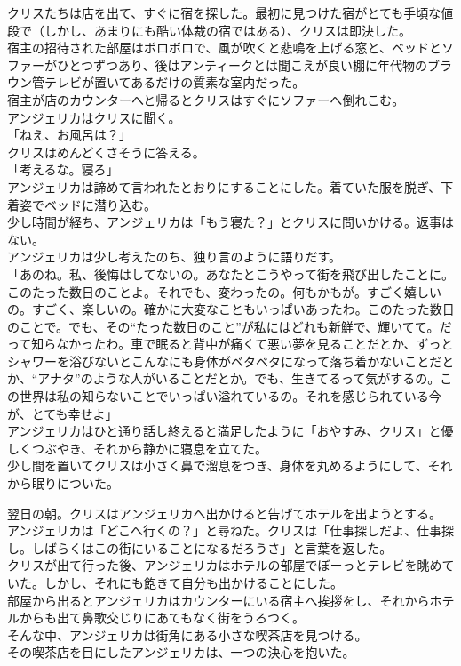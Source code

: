 \documentclass[b5j,10pt,openany]{jsbook}
\begin{document}
クリスたちは店を出て、すぐに宿を探した。最初に見つけた宿がとても手頃な値段で（しかし、あまりにも酷い体裁の宿ではある）、クリスは即決した。\\宿主の招待された部屋はボロボロで、風が吹くと悲鳴を上げる窓と、ベッドとソファーがひとつずつあり、後はアンティークとは聞こえが良い棚に年代物のブラウン管テレビが置いてあるだけの質素な室内だった。\\宿主が店のカウンターへと帰るとクリスはすぐにソファーへ倒れこむ。\\アンジェリカはクリスに聞く。\\「ねえ、お風呂は？」\\クリスはめんどくさそうに答える。\\「考えるな。寝ろ」\\アンジェリカは諦めて言われたとおりにすることにした。着ていた服を脱ぎ、下着姿でベッドに潜り込む。\\少し時間が経ち、アンジェリカは「もう寝た？」とクリスに問いかける。返事はない。\\アンジェリカは少し考えたのち、独り言のように語りだす。\\「あのね。私、後悔はしてないの。あなたとこうやって街を飛び出したことに。このたった数日のことよ。それでも、変わったの。何もかもが。すごく嬉しいの。すごく、楽しいの。確かに大変なこともいっぱいあったわ。このたった数日のことで。でも、その``たった数日のこと''が私にはどれも新鮮で、輝いてて。だって知らなかったわ。車で眠ると背中が痛くて悪い夢を見ることだとか、ずっとシャワーを浴びないとこんなにも身体がベタベタになって落ち着かないことだとか、``アナタ''のような人がいることだとか。でも、生きてるって気がするの。この世界は私の知らないことでいっぱい溢れているの。それを感じられている今が、とても幸せよ」\\アンジェリカはひと通り話し終えると満足したように「おやすみ、クリス」と優しくつぶやき、それから静かに寝息を立てた。\\少し間を置いてクリスは小さく鼻で溜息をつき、身体を丸めるようにして、それから眠りについた。

翌日の朝。クリスはアンジェリカへ出かけると告げてホテルを出ようとする。\\アンジェリカは「どこへ行くの？」と尋ねた。クリスは「仕事探しだよ、仕事探し。しばらくはこの街にいることになるだろうさ」と言葉を返した。\\クリスが出て行った後、アンジェリカはホテルの部屋でぼーっとテレビを眺めていた。しかし、それにも飽きて自分も出かけることにした。\\部屋から出るとアンジェリカはカウンターにいる宿主へ挨拶をし、それからホテルからも出て鼻歌交じりにあてもなく街をうろつく。\\そんな中、アンジェリカは街角にある小さな喫茶店を見つける。\\その喫茶店を目にしたアンジェリカは、一つの決心を抱いた。
\end{document}
